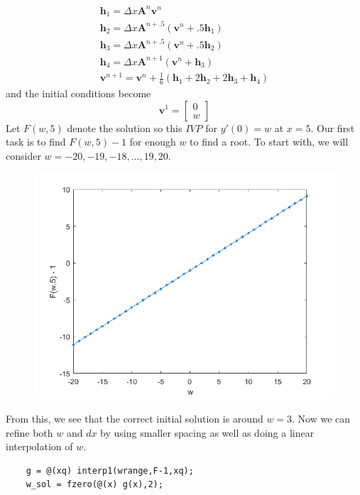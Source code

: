 \documentclass[]{article}
\theoremstyle{definition}
\numberwithin{equation}{section}
\begin{document}
\begin{gather*}
	\mathbf{h}_1 = \Delta x \mathbf{A}^{n} \mathbf{v}^n\\
	\mathbf{h}_2 = \Delta x \mathbf{A}^{n+.5} (\mathbf{v}^n+.5\mathbf{h}_1) \\
	\mathbf{h}_3 = \Delta x \mathbf{A}^{n+.5} (\mathbf{v}^n+.5\mathbf{h}_2) \\
	\mathbf{h}_4 = \Delta x \mathbf{A}^{n+1} (\mathbf{v}^n+\mathbf{h}_3) \\
	\mathbf{v}^{n+1} = \mathbf{v}^n + \frac{1}{6} (\mathbf{h}_1 + 2\mathbf{h}_2 + 2 \mathbf{h}_3 + \mathbf{h}_4) 
\end{gather*}
and the initial conditions become
\[
	\mathbf{v}^1 = \begin{bmatrix}
	0 \\
	w
	\end{bmatrix}
\]
Let $F(w,5)$ denote the solution so this $IVP$ for $y'(0) = w$ at $x = 5$. Our first task is to find $F(w,5)-1$ for enough $w$ to find a root. To start with, we will consider $ w = -20, -19, -18, \dots, 19, 20$.
	\begin{figure}[H]
		\centering
		\includegraphics[scale=.7]{ex9_fig.png} 
		\label{fig:ex9}
	\end{figure}

From this, we see that the correct initial solution is around $w = 3$. Now we can refine both $w$ and $dx$ by using smaller spacing as well as doing a linear interpolation of $w$.
\begin{lstlisting}
	g = @(xq) interp1(wrange,F-1,xq);
	w_sol = fzero(@(x) g(x),2);
\end{lstlisting}
\end{document}
